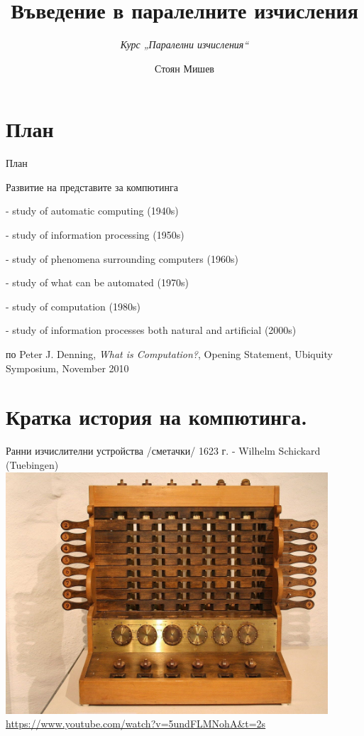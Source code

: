 \documentclass{beamer}
\title{Въведение в паралелните изчисления}
\subtitle{\textit{Курс „Паралелни изчисления“}}
\author{\newline \newline Стоян Мишев}
\date{} %
\begin{document}
\lstset{language=Python}
{ 
\frame{\titlepage}}


\section*{План}\begin{frame}{План}\tableofcontents\end{frame}


\begin{frame}{Развитие на представите за компютинга}
  
  - study of automatic computing (1940s)

  - study of information processing (1950s)

  - study of phenomena surrounding computers (1960s)

  - study of what can be automated (1970s)

  - study of computation (1980s)

  - study of information processes both natural and artificial (2000s) 

  \scriptsize
  по Peter J. Denning, \textit{What is Computation?}, Opening Statement, Ubiquity Symposium, November 2010

\end{frame}

\section{Кратка история на компютинга.}

\begin{frame}[plain]{Ранни изчислителни устройства /сметачки/}
  1623 г. - Wilhelm Schickard (Tuebingen)
  \centering
  \includegraphics[width=0.9\textwidth]{schickard-machine}
  \url{https://www.youtube.com/watch?v=5undFLMNohA&t=2s}
\end{frame}
\end{document}
